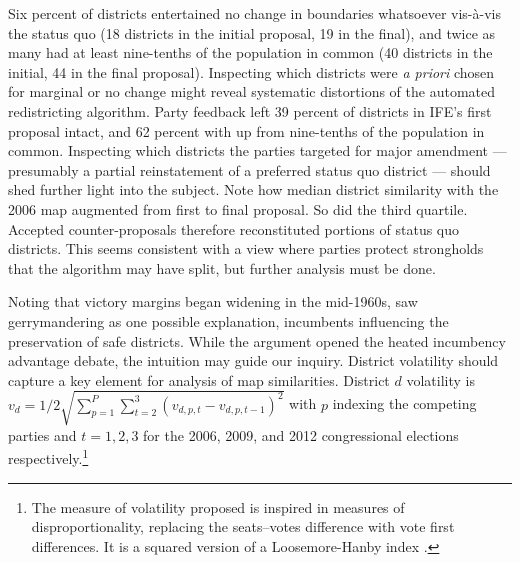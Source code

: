 \documentclass[letter,12pt]{article}
\begin{document}
Six percent of districts entertained no change in boundaries whatsoever vis-\`a-vis the status quo (18 districts in the initial proposal, 19 in the final), and twice as many had at least nine-tenths of the population in common (40 districts in the initial, 44 in the final proposal). Inspecting which districts were \emph{a priori} chosen for marginal or no change might reveal systematic distortions of the automated redistricting algorithm. Party feedback left 39 percent of districts in IFE's first proposal intact, and 62 percent with up from nine-tenths of the population in common. Inspecting which districts the parties targeted for major amendment --- presumably a partial reinstatement of a preferred status quo district --- should shed further light into the subject. Note how median district similarity with the 2006 map augmented from first to final proposal. So did the third quartile. Accepted counter-proposals therefore reconstituted portions of status quo districts. This seems consistent with a view where parties protect strongholds that the algorithm may have split, but further analysis must be done. 




Noting that victory margins began widening in the mid-1960s, \citet{mayhew1974vanishingMg} saw gerrymandering as one possible explanation, incumbents influencing the preservation of safe districts. While the argument opened the heated incumbency advantage debate, the intuition may guide our inquiry. District volatility should capture a key element for analysis of map similarities. District $d$ volatility is $v_d = 1/2 \sqrt{ \sum_{p=1}^P \sum_{t=2}^3 (v_{d,p,t}- v_{d,p,t-1})^2 }$ with $p$ indexing the competing parties and $t=1,2,3$ for the 2006,  2009, and 2012 congressional elections respectively.\footnote{The measure of volatility proposed is inspired in measures of disproportionality, replacing the seats--votes difference with vote first differences. It is a squared version of a Loosemore-Hanby index \citep{loosemore.hanbyDisproportionality1971,gallagherDisproportionality1991}.} 
\end{document}
